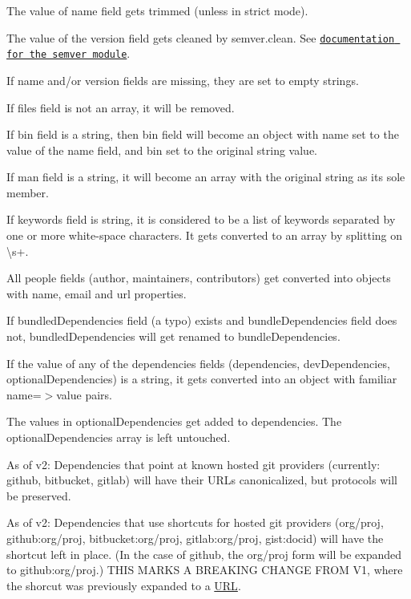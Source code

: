 \begin{DoxyItemize}
\item The value of {\ttfamily name} field gets trimmed (unless in strict mode).
\item The value of the {\ttfamily version} field gets cleaned by {\ttfamily semver.\+clean}. See \href{https://github.com/isaacs/node-semver}{\tt documentation for the semver module}.
\item If {\ttfamily name} and/or {\ttfamily version} fields are missing, they are set to empty strings.
\item If {\ttfamily files} field is not an array, it will be removed.
\item If {\ttfamily bin} field is a string, then {\ttfamily bin} field will become an object with {\ttfamily name} set to the value of the {\ttfamily name} field, and {\ttfamily bin} set to the original string value.
\item If {\ttfamily man} field is a string, it will become an array with the original string as its sole member.
\item If {\ttfamily keywords} field is string, it is considered to be a list of keywords separated by one or more white-\/space characters. It gets converted to an array by splitting on {\ttfamily \textbackslash{}s+}.
\item All people fields ({\ttfamily author}, {\ttfamily maintainers}, {\ttfamily contributors}) get converted into objects with name, email and url properties.
\item If {\ttfamily bundled\+Dependencies} field (a typo) exists and {\ttfamily bundle\+Dependencies} field does not, {\ttfamily bundled\+Dependencies} will get renamed to {\ttfamily bundle\+Dependencies}.
\item If the value of any of the dependencies fields ({\ttfamily dependencies}, {\ttfamily dev\+Dependencies}, {\ttfamily optional\+Dependencies}) is a string, it gets converted into an object with familiar {\ttfamily name=$>$value} pairs.
\item The values in {\ttfamily optional\+Dependencies} get added to {\ttfamily dependencies}. The {\ttfamily optional\+Dependencies} array is left untouched.
\item As of v2\+: Dependencies that point at known hosted git providers (currently\+: github, bitbucket, gitlab) will have their U\+R\+Ls canonicalized, but protocols will be preserved.
\item As of v2\+: Dependencies that use shortcuts for hosted git providers ({\ttfamily org/proj}, {\ttfamily github\+:org/proj}, {\ttfamily bitbucket\+:org/proj}, {\ttfamily gitlab\+:org/proj}, {\ttfamily gist\+:docid}) will have the shortcut left in place. (In the case of github, the {\ttfamily org/proj} form will be expanded to {\ttfamily github\+:org/proj}.) T\+H\+IS M\+A\+R\+KS A B\+R\+E\+A\+K\+I\+NG C\+H\+A\+N\+GE F\+R\+OM V1, where the shorcut was previously expanded to a \mbox{\hyperlink{namespace_u_r_l}{U\+RL}}.

\end{DoxyItemize}
